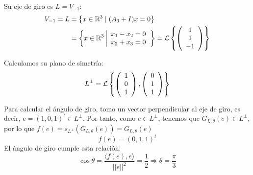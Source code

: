 \begin{ejercicio}
\begin{enumerate}
        Su eje de giro es $L=V_{-1}$:
        \begin{equation*}
            \begin{split}
                V_{-1}=L& = \left\{x\in \mathbb{R}^3 \mid (A_3+I)x=0\right\}\\
                & = \left\{x\in \mathbb{R}^3 \left|
                \begin{array}{c}
                    x_1-x_2=0 \\
                    x_2+x_3=0
                \end{array}
                \right.\right\}
                = \mathcal{L}\left\{\left(\begin{array}{c}
                     1 \\ 1 \\ -1
                \end{array}\right)\right\}
            \end{split}
        \end{equation*}

        Calculamos su plano de simetría:
        \begin{equation*}
            L^\perp = \mathcal{L}\left\{\left(\begin{array}{c}
                     1 \\ 0 \\ 1
                \end{array}\right),
                \left(\begin{array}{c}
                     0 \\ 1 \\ 1
                \end{array}\right)\right\}
        \end{equation*}

        Para calcular el ángulo de giro, tomo un vector perpendicular al eje de giro, es decir, $e=(1, 0, 1)^t\in L^\perp$. Por tanto, como $e\in L^\perp$, tenemos que $G_{L,\theta}(e)\in L^\perp$, por lo que $f(e)=s_{L^\perp}(G_{L,\theta}(e))=G_{L,\theta}(e)$
        \begin{equation*}
            f(e)=(0, 1, 1)^t
        \end{equation*}
        El ángulo de giro cumple esta relación:
        \begin{equation*}
            \cos \theta = \frac{\langle f(e),e\rangle}{||e||^2} = \frac{1}{2} \Longrightarrow \theta = \frac{\pi}{3}
        \end{equation*}


\end{enumerate}
\end{ejercicio}
